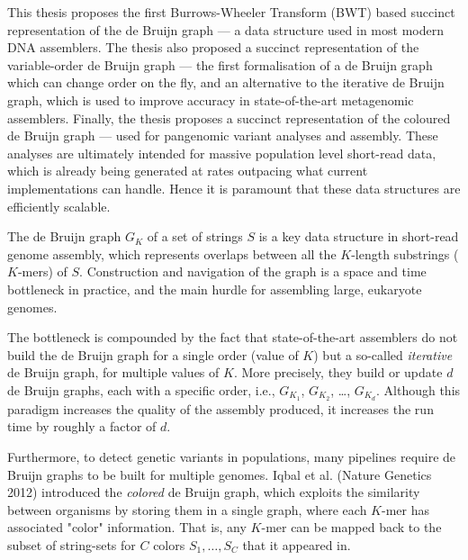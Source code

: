 
This thesis proposes the first Burrows-Wheeler Transform (BWT) based
 succinct representation of the de Bruijn graph --- a data
structure used in most modern DNA assemblers.
The thesis also proposed a succinct representation of the variable-order de Bruijn graph --- the first formalisation of
a de Bruijn graph which can change order on the fly, and an alternative to the iterative de Bruijn graph,
which is used to improve accuracy in state-of-the-art metagenomic assemblers.
Finally, the thesis proposes a succinct representation of the coloured de Bruijn graph --- used for pangenomic
variant analyses and assembly.
These analyses are ultimately intended for massive population level short-read data, which is already being
generated at rates outpacing what current implementations can handle.
Hence it is paramount that these data structures are efficiently scalable.

The de Bruijn graph $G_K$ of a set of strings $S$ is a key data structure in short-read genome assembly,
which represents overlaps between all the $K$-length substrings ($K$-mers) of $S$. Construction and navigation of the
graph is a space and time bottleneck in practice, and the main hurdle for assembling large, eukaryote genomes.

The bottleneck is compounded by the fact that state-of-the-art assemblers do not build the
de Bruijn graph for a single order (value of $K$) but a so-called \textit{iterative} de Bruijn graph, for
multiple values of $K$. More precisely, they build or update $d$ de Bruijn graphs, each with a specific
order, i.e., $G_{K_1}$,  $G_{K_2}$, \ldots,  $G_{K_d}$. Although this paradigm increases the quality of the assembly produced,
it increases the run time by roughly a factor of $d$.

Furthermore, to detect genetic variants in populations, many pipelines require de Bruijn graphs
to be built for multiple genomes. Iqbal et al. (Nature Genetics 2012) introduced the \textit{colored} de
Bruijn graph, which exploits the similarity between organisms by storing them in a single graph, where
each $K$-mer has associated "color" information. That is, any $K$-mer can be mapped back to the subset of
string-sets for $C$ colors ${S_1, \ldots, S_C}$ that it appeared in.


